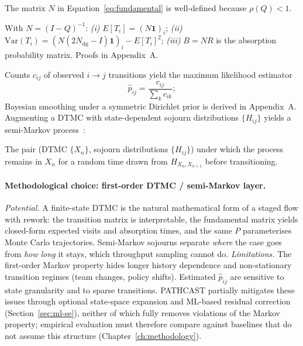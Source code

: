 \begin{definition}
\label{def:fundamental-matrix}
The matrix $N$ in Equation~\ref{eq:fundamental} is well-defined because
$\rho(Q) < 1$.
\end{definition}

\begin{theorem}
\label{thm:absorption}
With $N = (I-Q)^{-1}$:
\emph{(i)} $E[T_i] = (N\mathbf{1})_i$;
\emph{(ii)} $\text{Var}(T_i) = (N(2N_{\text{dg}}-I)\mathbf{1})_i - E[T_i]^2$;
\emph{(iii)} $B = NR$ is the absorption probability matrix. Proofs in
Appendix~A.
\end{theorem}

Counts $c_{ij}$ of observed $i \to j$ transitions yield the maximum
likelihood estimator
\begin{equation}
\label{eq:mle-transition}
\hat{p}_{ij} = \frac{c_{ij}}{\sum_{k} c_{ik}};
\end{equation}
Bayesian smoothing under a symmetric Dirichlet prior is derived in
Appendix~A. Augmenting a DTMC with state-dependent sojourn distributions
$\{H_{ij}\}$ yields a semi-Markov
process~\cite{RoggeSolti2015NonMarkovianSPN}:

\begin{definition}
\label{def:semi-markov}
The pair (DTMC $\{X_n\}$, sojourn distributions $\{H_{ij}\}$) under which
the process remains in $X_n$ for a random time drawn from
$H_{X_n,X_{n+1}}$ before transitioning.
\end{definition}

\paragraph{Methodological choice: first-order DTMC / semi-Markov layer.}
\emph{Potential.} A finite-state DTMC is the natural mathematical form of a
staged flow with rework: the transition matrix is interpretable, the
fundamental matrix yields closed-form expected visits and absorption
times, and the same $P$ parameterises Monte Carlo trajectories. Semi-Markov
sojourns separate \emph{where} the case goes from \emph{how long} it stays,
which throughput sampling cannot do.
\emph{Limitations.} The first-order Markov property hides longer history
dependence and non-stationary transition regimes (team changes, policy
shifts). Estimated $\hat{p}_{ij}$ are sensitive to state granularity and to
sparse transitions. PATHCAST partially mitigates these issues through
optional state-space expansion and ML-based residual correction
(Section~\ref{sec:ml-se}), neither of which fully removes violations of the
Markov property; empirical evaluation must therefore compare against
baselines that do not assume this structure
(Chapter~\ref{ch:methodology}).



